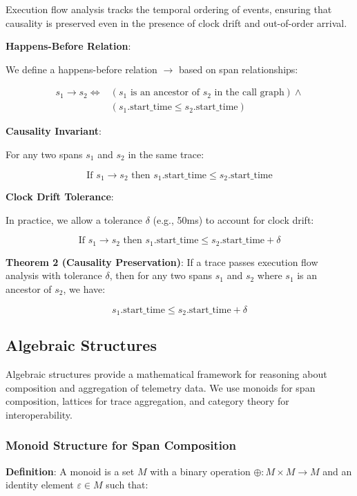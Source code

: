 Execution flow analysis tracks the temporal ordering of events, ensuring that causality is preserved even in the presence of clock drift and out-of-order arrival.

\textbf{Happens-Before Relation}:

We define a happens-before relation $\rightarrow$ based on span relationships:

\begin{align*}
s_1 \rightarrow s_2 \iff &(s_1 \text{ is an ancestor of } s_2 \text{ in the call graph}) \land \\
                         &(s_1.\text{start\_time} \leq s_2.\text{start\_time})
\end{align*}

\textbf{Causality Invariant}:

For any two spans $s_1$ and $s_2$ in the same trace:

\[
\text{If } s_1 \rightarrow s_2 \text{ then } s_1.\text{start\_time} \leq s_2.\text{start\_time}
\]

\textbf{Clock Drift Tolerance}:

In practice, we allow a tolerance $\delta$ (e.g., 50ms) to account for clock drift:

\[
\text{If } s_1 \rightarrow s_2 \text{ then } s_1.\text{start\_time} \leq s_2.\text{start\_time} + \delta
\]

\textbf{Theorem 2 (Causality Preservation)}:
If a trace passes execution flow analysis with tolerance $\delta$, then for any two spans $s_1$ and $s_2$ where $s_1$ is an ancestor of $s_2$, we have:

\[
s_1.\text{start\_time} \leq s_2.\text{start\_time} + \delta
\]

\subsection{Algebraic Structures}
\label{sec:algebra}

Algebraic structures provide a mathematical framework for reasoning about composition and aggregation of telemetry data. We use monoids for span composition, lattices for trace aggregation, and category theory for interoperability.

\subsubsection{Monoid Structure for Span Composition}

\textbf{Definition}: A monoid is a set $M$ with a binary operation $\oplus: M \times M \rightarrow M$ and an identity element $\varepsilon \in M$ such that:

